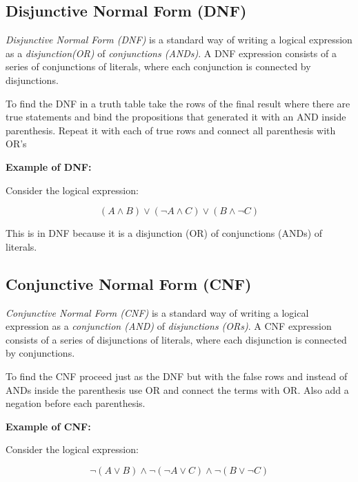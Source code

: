 \subsection{Disjunctive Normal Form (DNF)}

\emph{Disjunctive Normal Form (DNF)} is a standard way of writing a logical expression as a 
\emph{disjunction(OR)} of \emph{conjunctions (ANDs)}. A DNF expression consists of a series of
conjunctions of literals, where each conjunction is connected by disjunctions.
\vspace{\baselineskip}

To find the DNF in a truth table take the rows of the final result where there are
true statements and bind the propositions that generated it with an AND inside parenthesis.
Repeat it with each of true rows and connect all parenthesis with OR's
\vspace{\baselineskip}

\textbf{Example of DNF:}
\vspace{\baselineskip}

Consider the logical expression:

\[
	(A \land B) \lor (\neg A \land C) \lor (B \land \neg C)
\]

This is in DNF because it is a disjunction (OR) of conjunctions (ANDs) of literals.

\subsection{Conjunctive Normal Form (CNF)}

\emph{Conjunctive Normal Form (CNF)} is a standard way of writing a logical expression as a 
\emph{conjunction (AND)} of \emph{disjunctions (ORs)}. A CNF expression consists of a series of 
disjunctions of literals, where each disjunction is connected by conjunctions.
\vspace{\baselineskip}

To find the CNF proceed just as the DNF but with the false rows and instead
of ANDs inside the parenthesis use OR and connect the terms with OR\@. 
Also add a negation before each parenthesis.
\vspace{\baselineskip}

\textbf{Example of CNF:}
\vspace{\baselineskip}

Consider the logical expression:

\[
	\neg (A \lor B) \land \neg (\neg A \lor C) \land \neg (B \lor \neg C)
\]

